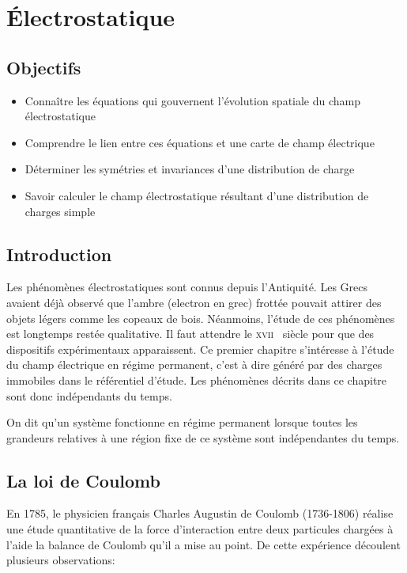 \chapter{Électrostatique}
\label{chap:electrostatique}
\section*{Objectifs}%
\label{sec:objectifs}
\begin{itemize}
	\item Connaître les équations qui gouvernent l'évolution spatiale 
	  du champ électrostatique 
	\item Comprendre le lien entre ces équations et une carte de champ 
	  électrique
	\item Déterminer les symétries et invariances d'une distribution de charge
	\item Savoir calculer le champ électrostatique résultant d'une 
	  distribution de charges simple
\end{itemize}
\section*{Introduction}%
\label{sec:introduction}
Les phénomènes électrostatiques sont connus depuis l'Antiquité.
Les Grecs avaient déjà observé que l'ambre (electron en grec)
frottée pouvait attirer des objets
légers comme les copeaux de bois.
Néanmoins, l'étude de ces phénomènes est longtemps restée qualitative.
Il faut attendre le \textsc{xvii} \ieme~siècle pour que des dispositifs 
expérimentaux apparaissent.
Ce premier chapitre s'intéresse à l'étude du champ électrique 
en régime permanent, c'est à dire généré par des charges immobiles dans le 
référentiel d'étude. Les phénomènes décrits dans ce chapitre sont 
donc indépendants du temps.

\begin{defn}
	On dit qu'un système fonctionne en régime permanent lorsque toutes les
	grandeurs relatives à une région fixe de ce système sont indépendantes 
	du temps.
\end{defn}

\section{La loi de Coulomb}%
\label{sec:interaction_coulombienne}
En 1785,  le physicien français Charles Augustin de Coulomb (1736-1806)
réalise une étude quantitative de la force d'interaction entre deux particules
chargées à l'aide la balance de Coulomb qu'il a mise au point.
De cette expérience découlent plusieurs observations:

